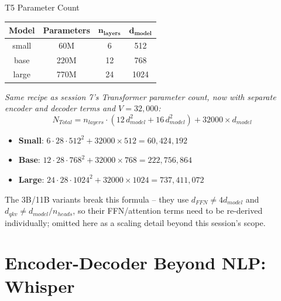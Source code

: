 \begin{vbframe}{T5 Parameter Count}

\begin{center}
\footnotesize
\begin{tabular}{|c|c|c|c|}
\hline
\textbf{Model} & \textbf{Parameters} & $\bm{n_{layers}}$ & $\bm{d_{model}}$ \\ \hline
small  & 60M  & 6  & 512  \\ \hline
base   & 220M & 12 & 768  \\ \hline
large  & 770M & 24 & 1024 \\ \hline
\end{tabular}
\end{center}

\textit{Same recipe as session 7's Transformer parameter count, now with separate encoder and decoder terms and $V=32{,}000$:}
$$N_{Total} = n_{layers}\cdot(12\,d_{model}^2 + 16\,d_{model}^2) + 32000\times d_{model}$$
\begin{itemize}
	\item \textbf{Small}: $6\cdot 28\cdot 512^2 + 32000\times512 = 60{,}424{,}192$
	\item \textbf{Base}: $12\cdot 28\cdot 768^2 + 32000\times768 = 222{,}756{,}864$
	\item \textbf{Large}: $24\cdot 28\cdot 1024^2 + 32000\times1024 = 737{,}411{,}072$
\end{itemize}
{\footnotesize The 3B/11B variants break this formula -- they use $d_{FFN}\neq4d_{model}$ and $d_{qkv}\neq d_{model}/n_{heads}$, so their FFN/attention terms need to be re-derived individually; omitted here as a scaling detail beyond this session's scope.}

\end{vbframe}


\section{Encoder-Decoder Beyond NLP: Whisper}

